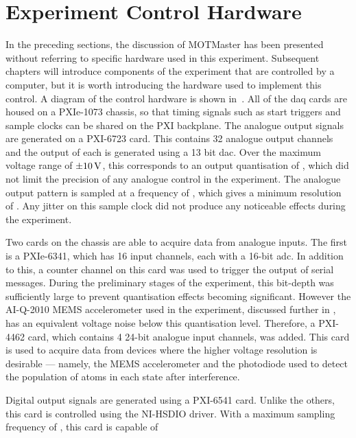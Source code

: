 \section{Experiment Control Hardware}\label{sec:mm_control_hardware}
In the preceding sections, the discussion of MOTMaster has been presented
without referring to specific hardware used in this experiment. Subsequent
chapters will introduce components of the experiment that are controlled by a
computer, but it is worth introducing the hardware used to implement this
control. A diagram of the control hardware is shown in~. All of the \ac{daq} cards are housed on a PXIe-1073 chassis, so that
timing signals such as start triggers and sample clocks can be shared on the
PXI backplane. The analogue output signals are generated on a
PXI-6723 card. This contains 32 analogue output channels and the output of
each is generated using a 13 bit \ac{dac}. Over the maximum voltage range of
\(\pm \sivalue{10}{\volt}\), this corresponds to an output quantisation of
, which did not limit the precision of any
analogue control in the experiment. The analogue output pattern is sampled at
a frequency of , which gives a minimum resolution
of . Any jitter on this sample clock did not
produce any noticeable effects during the experiment. \par\noindent
Two cards on the chassis are able to acquire data from analogue inputs. The
first is a PXIe-6341, which has 16 input channels, each with a 16-bit
\ac{adc}. In addition to this, a counter channel on this card was used
to trigger the output of serial messages. During the preliminary
stages of the experiment, this bit-depth was
sufficiently large to prevent quantisation effects becoming significant. However
the AI-Q-2010 MEMS accelerometer used in the experiment, discussed
further in , has an equivalent voltage
noise below this quantisation level. Therefore, a
PXI-4462 card, which contains 4 24-bit analogue input channels, was added.
This card is used to acquire data from devices where the higher voltage
resolution is desirable --- namely, the MEMS accelerometer and the
photodiode used to detect the population of atoms in each state after interference.\par\noindent
Digital output signals are generated using a PXI-6541 card. Unlike the
others, this card is controlled using the NI-HSDIO driver. With a maximum
sampling frequency of , this card is capable of
